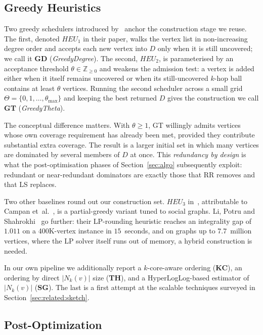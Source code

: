 \documentclass[11pt,a4paper]{article}
\begin{document}
\subsection{Greedy Heuristics}

Two greedy schedulers introduced by~\cite{nguyen2020} anchor the
construction stage we reuse. The first, denoted $\mathit{HEU_1}$ in
their paper, walks the vertex list in non-increasing degree order and
accepts each new vertex into $D$ only when it is still uncovered; we
call it \textbf{GD} (\emph{GreedyDegree}). The second, $\mathit{HEU_2}$,
is parameterised by an acceptance threshold $\theta\in\mathbb{Z}_{\ge 0}$
and weakens the admission test: a vertex is added either when it
itself remains uncovered or when its still-uncovered $k$-hop ball
contains at least $\theta$ vertices. Running the second scheduler
across a small grid $\Theta=\{0,1,\ldots,\theta_{\max}\}$ and keeping
the best returned $D$ gives the construction we call \textbf{GT}
(\emph{GreedyTheta}).

The conceptual difference matters. With $\theta\ge 1$, GT willingly
admits vertices whose own coverage requirement has already been met,
provided they contribute substantial extra coverage. The result is a
larger initial set in which many vertices are dominated by several
members of $D$ at once. This \emph{redundancy by design} is what the
post-optimisation phases of Section~\ref{sec:algo} subsequently
exploit: redundant or near-redundant dominators are exactly those that
RR removes and that LS replaces.

Two other baselines round out our construction set.
$\mathit{HEU_3}$ in~\cite{nguyen2020}, attributable to
Campan et~al.~\cite{campan2016}, is a partial-greedy variant tuned to
social graphs. Li, Potru and Shahrokhi~\cite{li2020} go further:
their LP-rounding heuristic reaches an integrality gap of $1.011$ on a
400K-vertex instance in $15$~seconds, and on graphs up to
7.7~million vertices, where the LP solver itself runs out of memory,
a hybrid construction is needed.

In our own pipeline we additionally report a $k$-core-aware ordering
(\textbf{KC}), an ordering by direct $|N_k(v)|$ size (\textbf{TH}), and
a HyperLogLog-based estimator of $|N_k(v)|$ (\textbf{SG}). The last is
a first attempt at the scalable techniques surveyed in
Section~\ref{sec:related:sketch}.

\subsection{Post-Optimization}
\end{document}

